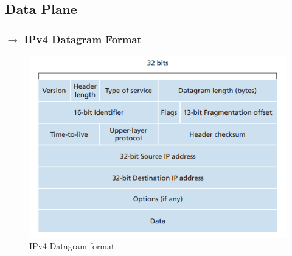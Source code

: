 \clearpage
\subsection[4.4 Data Plane]{\hspace*{0.075 em}\raisebox{0.2 em}{$\pmb{\drsh}$} Data Plane}
\label{subsec:data-plane}

\subsubsection[4.4.1 IPv4 Datagram Format]{$\rightarrow$ IPv4 Datagram Format}

\vspace{-0.5em}
\begin{figure}[H]
    \centering
    \includegraphics[width = 0.7\linewidth]{img/4/data-plane/IPv4-datagram-format.png}
    \caption{IPv4 Datagram format \cite{Kurose2017}}
    \label{fig:IPv4}
\end{figure}

